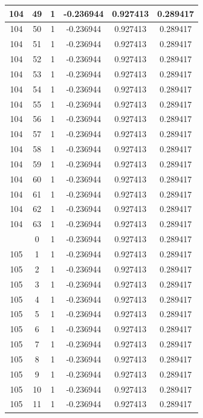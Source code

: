 \documentclass[12pt,a4paper]{article}
\numberwithin{equation}{section}
\numberwithin{figure}{section}
\numberwithin{table}{section}
\begin{document}
\begin{longtable}{|c|c|c|c|c|c|}
104 & 49 & 1 & -0.236944 & 0.927413 & 0.289417 \\ \hline
104 & 50 & 1 & -0.236944 & 0.927413 & 0.289417 \\ \hline
104 & 51 & 1 & -0.236944 & 0.927413 & 0.289417 \\ \hline
104 & 52 & 1 & -0.236944 & 0.927413 & 0.289417 \\ \hline
104 & 53 & 1 & -0.236944 & 0.927413 & 0.289417 \\ \hline
104 & 54 & 1 & -0.236944 & 0.927413 & 0.289417 \\ \hline
104 & 55 & 1 & -0.236944 & 0.927413 & 0.289417 \\ \hline
104 & 56 & 1 & -0.236944 & 0.927413 & 0.289417 \\ \hline
104 & 57 & 1 & -0.236944 & 0.927413 & 0.289417 \\ \hline
104 & 58 & 1 & -0.236944 & 0.927413 & 0.289417 \\ \hline
104 & 59 & 1 & -0.236944 & 0.927413 & 0.289417 \\ \hline
104 & 60 & 1 & -0.236944 & 0.927413 & 0.289417 \\ \hline
104 & 61 & 1 & -0.236944 & 0.927413 & 0.289417 \\ \hline
104 & 62 & 1 & -0.236944 & 0.927413 & 0.289417 \\ \hline
104 & 63 & 1 & -0.236944 & 0.927413 & 0.289417 \\ \hline
\pagebreak
105 & 0 & 1 & -0.236944 & 0.927413 & 0.289417 \\ \hline
105 & 1 & 1 & -0.236944 & 0.927413 & 0.289417 \\ \hline
105 & 2 & 1 & -0.236944 & 0.927413 & 0.289417 \\ \hline
105 & 3 & 1 & -0.236944 & 0.927413 & 0.289417 \\ \hline
105 & 4 & 1 & -0.236944 & 0.927413 & 0.289417 \\ \hline
105 & 5 & 1 & -0.236944 & 0.927413 & 0.289417 \\ \hline
105 & 6 & 1 & -0.236944 & 0.927413 & 0.289417 \\ \hline
105 & 7 & 1 & -0.236944 & 0.927413 & 0.289417 \\ \hline
105 & 8 & 1 & -0.236944 & 0.927413 & 0.289417 \\ \hline
105 & 9 & 1 & -0.236944 & 0.927413 & 0.289417 \\ \hline
105 & 10 & 1 & -0.236944 & 0.927413 & 0.289417 \\ \hline
105 & 11 & 1 & -0.236944 & 0.927413 & 0.289417 \\ \hline

\end{longtable}
\end{document}
